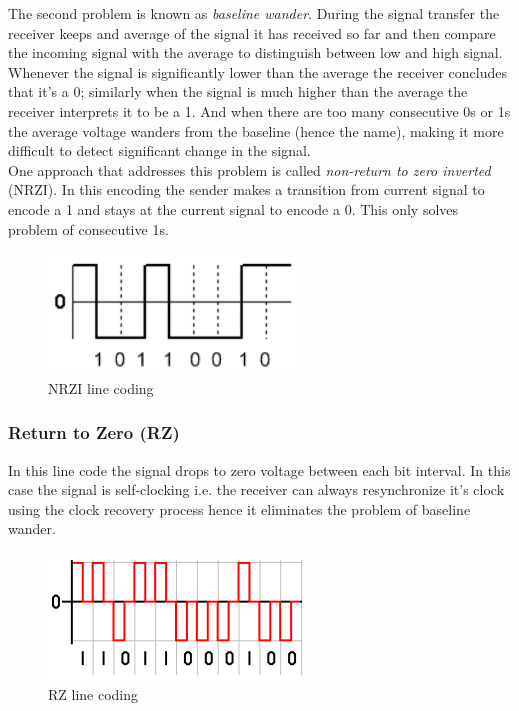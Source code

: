 The second problem is known as \textit{baseline wander}. During the signal transfer the receiver keeps and average of the signal it has received so far and then compare the incoming signal with the average to distinguish between low and high signal. Whenever the signal is significantly lower than the average the receiver concludes that it's a 0; similarly when the signal is much higher than the average the receiver interprets it to be a 1. And when there are too many consecutive 0s or 1s the average voltage wanders from the baseline (hence the name), making it more difficult to detect significant change in the signal.\\

One approach that addresses this problem is called \textit{non-return to zero inverted} (NRZI). In this encoding the sender makes a transition from current signal to encode a 1 and stays at the current signal to encode a 0. This only solves problem of consecutive 1s.

\begin{figure}[H]
    \centering
    \includegraphics[width=0.6\textwidth]{img/NRZI.png}
    \caption{NRZI line coding}
    \label{fig:NRZI}
\end{figure}

\subsubsection{Return to Zero (RZ)}
\label{RZ}
In this line code the signal drops to zero voltage between each bit interval. In this case the signal is self-clocking i.e. the receiver can always resynchronize it's clock using the clock recovery process hence it eliminates the problem of baseline wander.

\begin{figure}[H]
    \centering
    \includegraphics[width=0.6\textwidth]{img/RZ.png}
    \caption{RZ line coding}
    \label{fig:RZ}
\end{figure}


